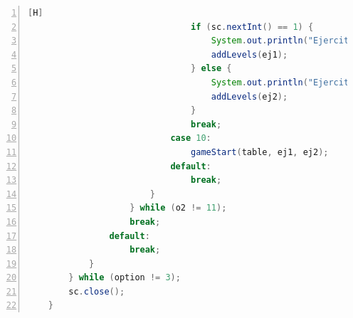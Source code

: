 \documentclass{article}
\begin{document}
\begin{lstlisting}[language=java,caption={Método main Final}, numbers=left][H]
                                if (sc.nextInt() == 1) {
                                    System.out.println("Ejercito 1:");
                                    addLevels(ej1);
                                } else {
                                    System.out.println("Ejercito 2:");
                                    addLevels(ej2);
                                }
                                break;
                            case 10:
                                gameStart(table, ej1, ej2);
                            default:
                                break;
                        }
                    } while (o2 != 11);
                    break;
                default:
                    break;
            }
        } while (option != 3);
        sc.close();
    }
	\end{lstlisting}	
	
\end{document}
